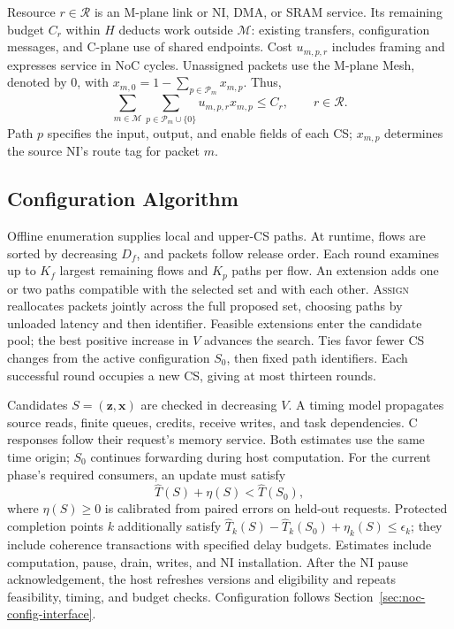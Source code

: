 Resource $r\in\mathcal R$ is an M-plane link or NI, DMA, or SRAM service.
Its remaining budget $C_r$ within $H$ deducts work outside $\mathcal M$:
existing transfers, configuration messages, and C-plane use of shared endpoints.
Cost $u_{m,p,r}$ includes framing and expresses service in NoC cycles.
Unassigned packets use the M-plane Mesh, denoted
by 0, with $x_{m,0}=1-\sum_{p\in\mathcal P_m}x_{m,p}$. Thus,
\begin{equation}
  \sum_{m\in\mathcal M}\sum_{p\in\mathcal P_m\cup\{0\}}
  u_{m,p,r}x_{m,p}\leq C_r,\qquad r\in\mathcal R.
  \label{eq:noc-resource-capacity}
\end{equation}
Path $p$ specifies the input, output, and enable fields of each CS;
$x_{m,p}$ determines the source NI's route tag for packet $m$.

\subsection{Configuration Algorithm}
\label{sec:noc-algorithm}

Offline enumeration supplies local and upper-CS paths. At runtime,
flows are sorted by decreasing $D_f$, and packets follow release order.
Each round examines up to $K_f$ largest remaining flows and $K_p$ paths per flow.
An extension adds one or two paths compatible with the selected set
and with each other.
\textsc{Assign} reallocates packets jointly across the full proposed set,
choosing paths by unloaded latency and then identifier. Feasible extensions
enter the candidate pool; the best positive increase in $V$ advances
the search. Ties favor fewer CS changes from the active configuration
$S_0$, then fixed path identifiers. Each successful round occupies a new
CS, giving at most thirteen rounds.

Candidates $S=(\mathbf z,\mathbf x)$ are checked in decreasing $V$.
A timing model propagates
source reads, finite queues, credits, receive writes, and task dependencies.
C responses follow their request's memory service. Both estimates use
the same time origin; $S_0$ continues forwarding during host computation.
For the current phase's required consumers, an update must satisfy
\begin{equation}
  \widehat T(S)+\eta(S)<\widehat T(S_0),
  \label{eq:noc-switching-check}
\end{equation}
where $\eta(S)\geq0$ is calibrated from paired errors on held-out requests.
Protected completion points $k$ additionally satisfy
$\widehat T_k(S)-\widehat T_k(S_0)+\eta_k(S)\leq\epsilon_k$;
they include coherence transactions with specified delay budgets.
Estimates include computation, pause, drain, writes, and NI installation.
After the NI pause acknowledgement, the host refreshes versions and
eligibility and repeats feasibility, timing, and budget checks. Configuration
follows Section~\ref{sec:noc-config-interface}.

